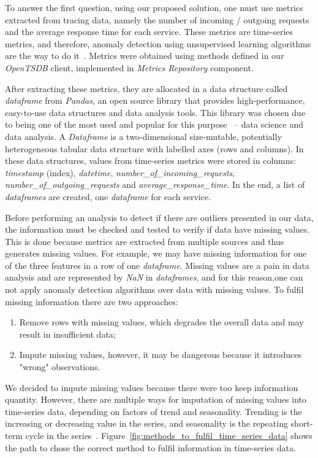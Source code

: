 To answer the first question, using our proposed solution, one must use metrics extracted from tracing data, namely the number of incoming / outgoing requests and the average response time for each service. These metrics are time-series metrics, and therefore, anomaly detection using unsupervised learning algorithms are the way to do it~\cite{Brillinger2006}. Metrics were obtained using methods defined in our \emph{OpenTSDB} client, implemented in \emph{Metrics Repository} component.

After extracting these metrics, they are allocated in a data structure called \emph{dataframe} from \emph{Pandas}, an open source library that provides high-performance, easy-to-use data structures and data analysis tools. This library was chosen due to being one of the most used and popular for this purpose~\cite{pandas} -- data science and data analysis. A \emph{Dataframe} is a two-dimensional size-mutable, potentially heterogeneous tabular data structure with labelled axes (rows and columns).  In these data structures, values from time-series metrics were stored in columns: \emph{timestamp} (index), \emph{datetime}, \emph{number\_of\_incoming\_requests}, \emph{number\_of\_outgoing\_requests} and \emph{average\_response\_time}. In the end, a list of \emph{dataframes} are created, one \emph{dataframe} for each service.

Before performing an analysis to detect if there are outliers presented in our data, the information must be checked and tested to verify if data have missing values. This is done because metrics are extracted from multiple sources and thus generates missing values. For example, we may have missing information for one of the three features in a row of one \emph{dataframe}. Missing values are a pain in data analysis and are represented by \emph{NaN} in \emph{dataframes}, and for this reason,one can not apply anomaly detection algorithms over data with missing values. To fulfil missing information there are two approaches:

\begin{enumerate}
    \item Remove rows with missing values, which degrades the overall data and may result in insufficient data;
    \item Impute missing values, however, it may be dangerous because it introduces "wrong" observations.
\end{enumerate}

We decided to impute missing values because there were too keep information quantity. However, there are multiple ways for imputation of missing values into time-series data, depending on factors of trend and seasonality. Trending is the increasing or decreasing value in the series, and seasonality is the repeating short-term cycle in the series~\cite{Brillinger2006}. Figure~\ref{fig:methods_to_fulfil_time_series_data} shows the path to chose the correct method to fulfil information in time-series data.


